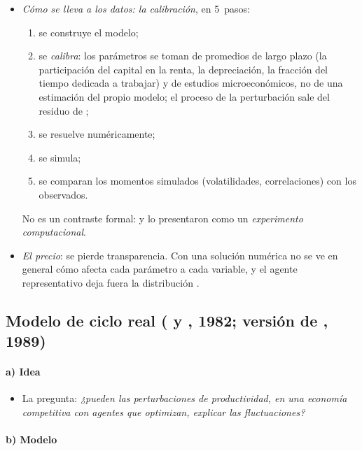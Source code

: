 \documentclass[11pt]{article}
\begin{document}
\begin{itemize}
\item \emph{Cómo se lleva a los datos: la calibración}\nocite{KydlandPrescott1982Time,KydlandPrescott1996Computational}, en 5~pasos:
  \begin{enumerate}
  \item se construye el modelo;
  \item se \emph{calibra}: los parámetros se toman de promedios de largo plazo (la participación del capital en la renta, la depreciación, la fracción del tiempo dedicada a trabajar) y de estudios microeconómicos, no de una estimación del propio modelo; el proceso de la perturbación sale del residuo de ;
  \item se resuelve numéricamente;
  \item se simula;
  \item se comparan los momentos simulados (volatilidades, correlaciones) con los observados.
  \end{enumerate}
  No es un contraste formal:  y  lo presentaron como un \emph{experimento computacional}.
\item \emph{El precio}: se pierde transparencia. Con una solución numérica no se ve en general cómo afecta cada parámetro a cada variable, y el agente representativo deja fuera la distribución .
\end{itemize}

\subsection{Modelo de ciclo real ( y , 1982; versión de , 1989)}\label{sec:rbc}

\paragraph{a) Idea}

\begin{itemize}
\item La pregunta: \emph{¿pueden las perturbaciones de productividad, en una economía competitiva con agentes que optimizan, explicar las fluctuaciones?}
\end{itemize}

\paragraph{b) Modelo}
\end{document}
